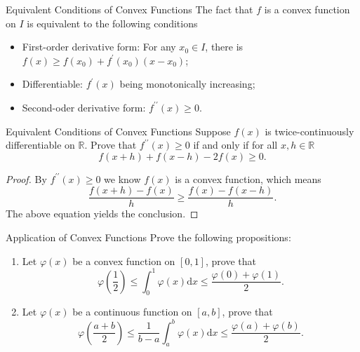 \begin{proposition}{Equivalent Conditions of Convex Functions}{}
  The fact that $f$ is a convex function on $I$ is equivalent to
  the following conditions
  \begin{itemize}
  \item First-order derivative form: For any $x_0 \in I$,
    there is $f(x) \geq f(x_0) + f^{\prime}(x_0) (x - x_0)$;
  \item Differentiable: $f^{\prime}(x)$ being monotonically increasing;
  \item Second-oder derivative form: $f^{\prime\prime}(x) \geq 0$.
  \end{itemize}
\end{proposition}

\begin{example}{Equivalent Conditions of Convex Functions}{}
  Suppose $f(x)$ is twice-continuously differentiable on $\mathbb{R}$.
  Prove that $f^{\prime\prime}(x) \geq 0$ if and only if for all $x,h \in \mathbb{R}$
  \begin{equation}
    f(x+h) + f(x-h) -2f(x) \geq 0.
  \end{equation}
\end{example}

\begin{proof}
  By $f^{\prime\prime}(x) \geq 0$ we know $f(x)$ is a convex function,
  which means
  \begin{equation}
    \frac{f(x+h) - f(x)}{h} \geq \frac{f(x) - f(x-h)}{h}.
  \end{equation}
  The above equation yields the conclusion.
\end{proof}

\begin{example}{Application of Convex Functions}{}
  Prove the following propositions:
  \begin{enumerate}
  \item Let $\varphi(x)$ be a convex function on $[0, 1]$, prove that
    \begin{equation}
      \varphi (\frac{1}{2}) \leq \int_0^1\varphi(x)\mathrm{d} x \leq \frac{\varphi(0) + \varphi(1)}{2}.
    \end{equation}
  \item Let $\varphi(x)$ be a continuous function on $[a, b]$, prove that
    \begin{equation}
      \varphi (\frac{a+b}{2}) \leq \frac{1}{b-a} \int_a^b \varphi(x)\mathrm{d} x \leq \frac{\varphi(a) + \varphi(b)}{2}.
    \end{equation}
  \end{enumerate}
\end{example}

